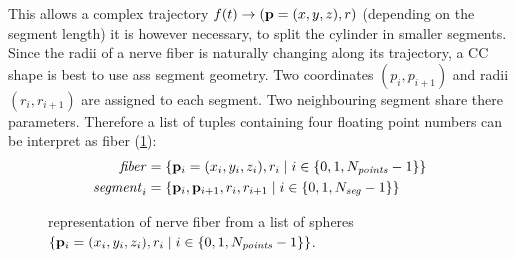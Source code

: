 This allows a complex trajectory $f(t) \rightarrow \left(\mathbf{p}=(x,y,z),r\right)$ (depending on the segment length) it is however necessary, to split the cylinder in smaller segments. Since the radii of a nerve fiber is naturally changing along its trajectory, a \ac{CC} shape is best to use ass segment geometry.
Two coordinates $(p_i, p_{i+1})$ and radii $(r_i, r_{i+1})$ are assigned to each segment. Two neighbouring segment share there parameters.
Therefore a list of tuples containing four floating point numbers can be interpret as fiber (\cref{fig:fiberReb}):
\begin{align}
\begin{split}
\mathit{fiber} &= \left\{ \mathbf{p}_i=(x_i,y_i,z_i), r_i \mid i \in \{0,1,N_{\mathit{points}}-1\}\right\} \\
\mathit{segment}_i &= \left\{ \mathbf{p}_i, \mathbf{p}_{i+1}, r_i, r_{i+1} \mid i \in \{0,1,N_{\mathit{seg}}-1\} \right\}
\end{split}
\end{align}
% 
% 
\begin{figure}[!t]
    \def\tikzwidth{0.85\textwidth}
    \centering
	\caption[]{representation of nerve fiber from a list of spheres $\left\{ \mathbf{p}_i=(x_i,y_i,z_i), r_i \mid i \in \{0,1,N_{\mathit{points}}-1\}\right\}$.
	}
	\label{fig:fiberReb}
\end{figure}
% 
% 
